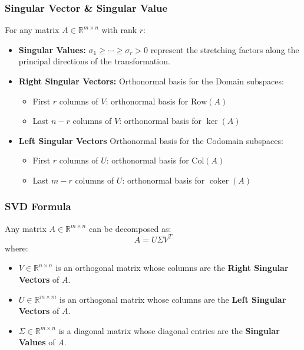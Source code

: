 \documentclass{article}
\begin{document}
\subsubsection{Singular Vector \& Singular Value}
For any matrix $A \in \mathbb{R}^{m \times n}$ with rank $r$:
\begin{itemize}
    \item \textbf{Singular Values:} $\sigma_1 \geq \cdots \geq \sigma_r > 0$ represent the stretching factors along the principal directions of the transformation.
    \item \textbf{Right Singular Vectors:} Orthonormal basis for the Domain subspaces:
        \begin{itemize}
            \item First $r$ columns of $V$: orthonormal basis for $\text{Row}(A)$
            \item Last $n-r$ columns of $V$: orthonormal basis for $\ker(A)$
        \end{itemize}
    \item \textbf{Left Singular Vectors} Orthonormal basis for the Codomain subspaces:
        \begin{itemize}
            \item First $r$ columns of $U$: orthonormal basis for $\text{Col}(A)$
            \item Last $m-r$ columns of $U$: orthonormal basis for $\operatorname{coker}(A)$
        \end{itemize}
\end{itemize}

\subsubsection{SVD Formula}
Any matrix $A \in \mathbb{R}^{m \times n}$ can be decomposed as:
\[
    A = U \Sigma V^T
\]
where:
\begin{itemize}
    \item $V \in \mathbb{R}^{n \times n}$ is an orthogonal matrix whose columns are the \textbf{Right Singular Vectors} of $A$.
    \item $U \in \mathbb{R}^{m \times m}$ is an orthogonal matrix whose columns are the \textbf{Left Singular Vectors} of $A$.
    \item $\Sigma \in \mathbb{R}^{m \times n}$ is a diagonal matrix whose diagonal entries are the \textbf{Singular Values} of $A$.
\end{itemize}
\end{document}

